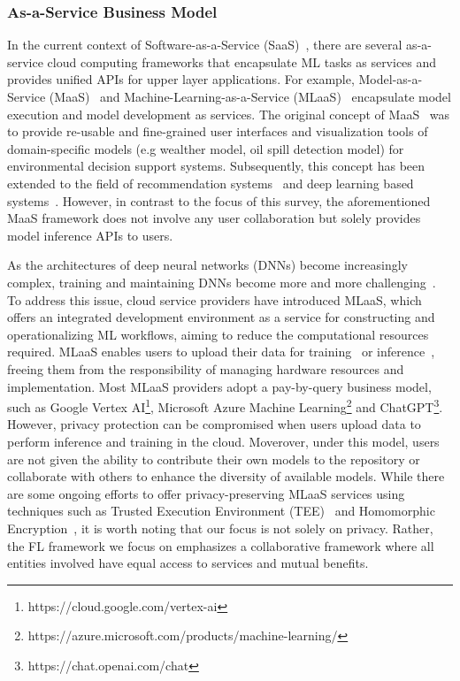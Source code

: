 \subsubsection{As-a-Service Business Model}
\label{sec:aas}
In the current context of Software-as-a-Service (SaaS)~\cite{brereton1999future}, there are several as-a-service cloud computing frameworks that encapsulate ML tasks as services and provides unified APIs for upper layer applications. 
For example, Model-as-a-Service (MaaS)~\cite{geller2007model, roman2009model, zou2012maas, liu2021jizhi, sun2022black} and Machine-Learning-as-a-Service (MLaaS)~\cite{ribeiro2015mlaas, hanzlik2021mlcapsule, hesamifard2018privacy,li2017scaling, kourtellis2020flaas} encapsulate model execution and model development as services.
The original concept of MaaS~\cite{geller2007model, roman2009model} was to provide re-usable and fine-grained user interfaces and visualization tools of domain-specific models (e.g wealther model, oil spill detection model) for environmental decision support systems.
Subsequently, this concept has been extended to the field of recommendation systems~\cite{zou2012maas} and deep learning based systems~\cite{liu2021jizhi, sun2022black}.
However, in contrast to the focus of this survey, the aforementioned MaaS framework does not involve any user collaboration but solely provides model inference APIs to users.

As the architectures of deep neural networks (DNNs) become increasingly complex, training and maintaining DNNs become more and more challenging~\cite{han2021pre}. To address this issue, cloud service providers have introduced MLaaS, which offers an integrated development environment as a service for constructing and operationalizing ML workflows, aiming to reduce the computational resources required.
MLaaS enables users to upload their data for training~\cite{ribeiro2015mlaas, zhao2021veriml, hesamifard2018privacy} or inference~\cite{hanzlik2021mlcapsule}, freeing them from the responsibility of managing hardware resources and implementation.
Most MLaaS providers adopt a pay-by-query business model, such as Google Vertex AI\footnote{https://cloud.google.com/vertex-ai}, Microsoft Azure Machine Learning\footnote{https://azure.microsoft.com/products/machine-learning/} and ChatGPT\footnote{https://chat.openai.com/chat}.
However, privacy protection can be compromised when users upload data to perform inference and training in the cloud.
Moverover, under this model, users are not given the ability to contribute their own models to the repository or collaborate with others to enhance the diversity of available models. 
While there are some ongoing efforts to offer privacy-preserving MLaaS services using techniques such as Trusted Execution Environment (TEE)~\cite{hanzlik2021mlcapsule, mckeen2016intel} and Homomorphic Encryption~\cite{hesamifard2018privacy,gentry2009fully}, it is worth noting that our focus is not solely on privacy.
Rather, the FL framework we focus on emphasizes a collaborative framework where all entities involved have equal access to services and mutual benefits.

